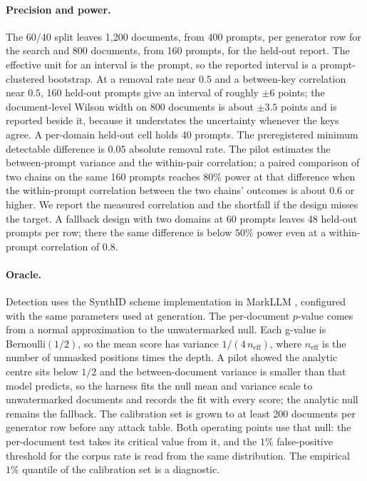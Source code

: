 \paragraph{Precision and power.}
The $60/40$ split leaves 1{,}200 documents, from 400 prompts, per generator row for the search and 800 documents, from 160 prompts, for the held-out report. The effective unit for an interval is the prompt, so the reported interval is a prompt-clustered bootstrap. At a removal rate near $0.5$ and a between-key correlation near $0.5$, 160 held-out prompts give an interval of roughly $\pm 6$ points; the document-level Wilson width on 800 documents is about $\pm 3.5$ points and is reported beside it, because it understates the uncertainty whenever the keys agree. A per-domain held-out cell holds 40 prompts. The preregistered minimum detectable difference is $0.05$ absolute removal rate. The pilot estimates the between-prompt variance and the within-pair correlation; a paired comparison of two chains on the same 160 prompts reaches $80\%$ power at that difference when the within-prompt correlation between the two chains' outcomes is about $0.6$ or higher. We report the measured correlation and the shortfall if the design misses the target. A fallback design with two domains at 60 prompts leaves 48 held-out prompts per row; there the same difference is below $50\%$ power even at a within-prompt correlation of $0.8$.

\paragraph{Oracle.}
Detection uses the SynthID scheme implementation in MarkLLM \citep{markllm}, configured with the same parameters used at generation. The per-document $p$-value comes from a normal approximation to the unwatermarked null. Each g-value is Bernoulli$(1/2)$, so the mean score has variance $1/(4\,n_{\mathrm{eff}})$, where $n_{\mathrm{eff}}$ is the number of unmasked positions times the depth. A pilot showed the analytic centre sits below $1/2$ and the between-document variance is smaller than that model predicts, so the harness fits the null mean and variance scale to unwatermarked documents and records the fit with every score; the analytic null remains the fallback. The calibration set is grown to at least 200 documents per generator row before any attack table. Both operating points use that null: the per-document test takes its critical value from it, and the $1\%$ false-positive threshold for the corpus rate is read from the same distribution. The empirical $1\%$ quantile of the calibration set is a diagnostic.

